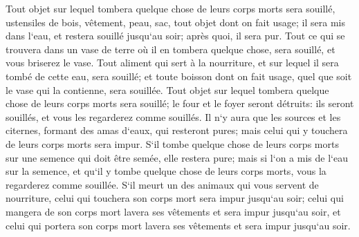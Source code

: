 \verse Tout objet sur lequel tombera quelque chose de leurs corps morts sera souillé, ustensiles de bois, vêtement, peau, sac, tout objet dont on fait usage; il sera mis dans l`eau, et restera souillé jusqu`au soir; après quoi, il sera pur. 
\verse Tout ce qui se trouvera dans un vase de terre où il en tombera quelque chose, sera souillé, et vous briserez le vase. 
\verse Tout aliment qui sert à la nourriture, et sur lequel il sera tombé de cette eau, sera souillé; et toute boisson dont on fait usage, quel que soit le vase qui la contienne, sera souillée. 
\verse Tout objet sur lequel tombera quelque chose de leurs corps morts sera souillé; le four et le foyer seront détruits: ils seront souillés, et vous les regarderez comme souillés. 
\verse Il n`y aura que les sources et les citernes, formant des amas d`eaux, qui resteront pures; mais celui qui y touchera de leurs corps morts sera impur. 
\verse S`il tombe quelque chose de leurs corps morts sur une semence qui doit être semée, elle restera pure; 
\verse mais si l`on a mis de l`eau sur la semence, et qu`il y tombe quelque chose de leurs corps morts, vous la regarderez comme souillée. 
\verse S`il meurt un des animaux qui vous servent de nourriture, celui qui touchera son corps mort sera impur jusqu`au soir; 
\verse celui qui mangera de son corps mort lavera ses vêtements et sera impur jusqu`au soir, et celui qui portera son corps mort lavera ses vêtements et sera impur jusqu`au soir. 
